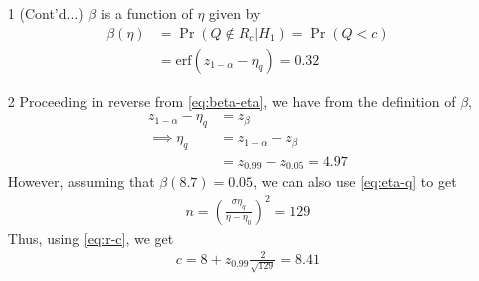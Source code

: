 \documentclass{beamer}
\providecommand{\pr}[1]{\ensuremath{\Pr\left(#1\right)}}
\providecommand{\erf}[1]{\ensuremath{\text{erf}(#1)}}
\begin{document}
\begin{frame}
	\begin{enumerate}
		\item[1] (Cont'd...) $\beta$ is a function of $\eta$ given by
			\begin{align}
				\beta(\eta) &= \pr{Q \notin R_c | H_1} = \pr{Q < c} \\
				&= \erf{z_{1 - \alpha} - \eta_q} = 0.32
				\label{eq:beta-eta}
			\end{align}
		\item[2] Proceeding in reverse from \eqref{eq:beta-eta}, we have from the definition of $\beta$, 
			\begin{align}
				z_{1 - \alpha} - \eta_q &= z_{\beta} \\
				\implies \eta_q &= z_{1 - \alpha} - z_{\beta} \\
				&= z_{0.99} - z_{0.05} = 4.97
				\label{eq:eta-q-rev}
			\end{align}
			However, assuming that $\beta(8.7) = 0.05$, we can also use \eqref{eq:eta-q} to get 
			\begin{align}
				n = \left(\frac{\sigma\eta_q}{\eta - \eta_0}\right)^2 = 129
				\label{eq:n}
			\end{align}
			Thus, using \eqref{eq:r-c}, we get 
			\begin{align}
				c = 8 + z_{0.99}\frac{2}{\sqrt{129}} = 8.41
				\label{eq:c-ans}
			\end{align}
	\end{enumerate}
\end{frame}
\end{document}
